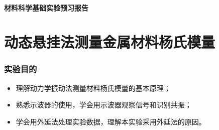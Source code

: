 \documentclass[a4paper,utf8]{article}
\begin{document}
\begin{center}
    {\mbox{}\\[7em]\bfseries\songti%
    材料科学基础实验预习报告}\\[34mm]
\end{center}
\newpage
\part{动态悬挂法测量金属材料杨氏模量}
\section{实验目的}
    \begin{itemize}
        \item 理解动力学振动法测量材料杨氏模量的基本原理；
        \item 熟悉示波器的使用，学会用示波器观察信号和识别共振； 
        \item 学会用外延法处理实验数据，理解本实验采用外延法的原因。
    \end{itemize}
\end{document}
